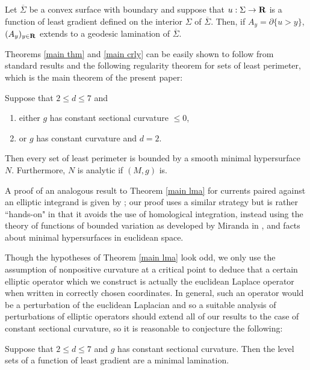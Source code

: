 \begin{theorem}\label{main crly}
Let $\overline \Sigma$ be a convex surface with boundary and suppose that $u: \Sigma \to \mathbf{R}$ is a function of least gradient defined on the interior $\Sigma$ of $\overline \Sigma$.
Then, if $A_y = \partial \{u > y\}$, $(A_y)_{y \in \mathbf{R}}$ extends to a geodesic lamination of $\overline \Sigma$.
\end{theorem}

Theorems \ref{main thm} and \ref{main crly} can be easily shown to follow from standard results and the following regularity theorem for sets of least perimeter, which is the main theorem of the present paper:

\begin{theorem}\label{main lma}
Suppose that $2 \leq d \leq 7$ and
\begin{enumerate}
\item either $g$ has constant sectional curvature $\leq 0$,
\item or $g$ has constant curvature and $d = 2$.
\end{enumerate}
Then every set of least perimeter is bounded by a smooth minimal hypersurface $N$.
Furthermore, $N$ is analytic if $(M, g)$ is.
\end{theorem}

A proof of an analogous result to Theorem \ref{main lma} for currents paired against an elliptic integrand is given by \cite[\S5.3]{federer2014geometric}; our proof uses a similar strategy but is rather ``hands-on" in that it avoids the use of homological integration, instead using the theory of functions of bounded variation as developed by Miranda in \cite{Miranda64} \cite{Miranda66} \cite{Miranda67}, and facts about minimal hypersurfaces in euclidean space.

Though the hypotheses of Theorem \ref{main lma} look odd, we only use the assumption of nonpositive curvature at a critical point to deduce that a certain elliptic operator which we construct is actually the euclidean Laplace operator when written in correctly chosen coordinates.
In general, such an operator would be a perturbation of the euclidean Laplacian and so a suitable analysis of perturbations of elliptic operators should extend all of our results to the case of constant sectional curvature, so it is reasonable to conjecture the following:

\begin{conjecture}\label{main conj}
Suppose that $2 \leq d \leq 7$ and $g$ has constant sectional curvature.
Then the level sets of a function of least gradient are a minimal lamination.
\end{conjecture}

